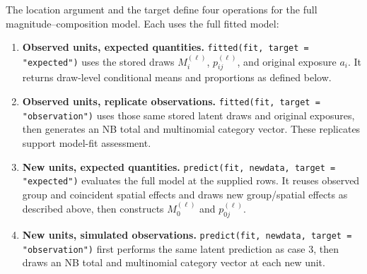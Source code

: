 \documentclass[11pt]{article}
\begin{document}
The location argument and the target define four operations for the full
magnitude--composition model. Each uses the full fitted model:
\begin{enumerate}
\item \textbf{Observed units, expected quantities.}
  \texttt{fitted(fit, target = "expected")} uses the stored draws
  \(M_i^{(\ell)}\), \(p_{ij}^{(\ell)}\), and original exposure \(a_i\).
  It returns draw-level conditional means and proportions as defined below.
\item \textbf{Observed units, replicate observations.}
  \texttt{fitted(fit, target = "observation")} uses those same stored
  latent draws and original exposures, then generates an NB total and
  multinomial category vector. These replicates support model-fit assessment.
\item \textbf{New units, expected quantities.}
  \texttt{predict(fit, newdata, target = "expected")} evaluates the full
  model at the supplied rows. It reuses observed group and coincident spatial
  effects and draws new group/spatial effects as described above, then
  constructs \(M_0^{(\ell)}\) and \(p_{0j}^{(\ell)}\).
\item \textbf{New units, simulated observations.}
  \texttt{predict(fit, newdata, target = "observation")} first performs
  the same latent prediction as case 3, then draws an NB total and multinomial
  category vector at each new unit.
\end{enumerate}
\end{document}
